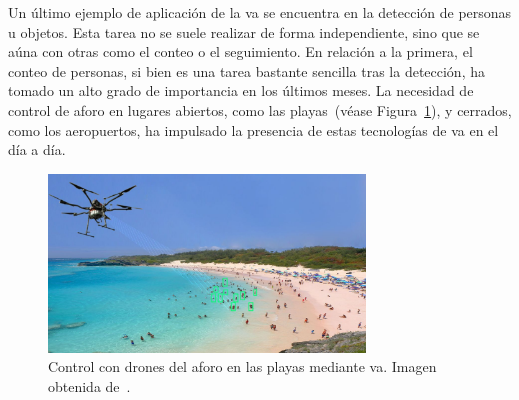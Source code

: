 Un último ejemplo de aplicación de la \acrshort{va} se encuentra en la detección de personas u objetos. Esta tarea no se suele realizar de forma independiente, sino que se aúna con otras como el conteo o el seguimiento. En relación a la primera, el conteo de personas, si bien es una tarea bastante sencilla tras la detección, ha tomado un alto grado de importancia en los últimos meses. La necesidad de control de aforo en lugares abiertos, como las playas~(véase Figura~\ref{fig.aforo}), y cerrados, como los aeropuertos, ha impulsado la presencia de estas tecnologías de \acrshort{va} en el día a día.
\vspace{10pt}
\begin{figure}[H]
		\begin{center}
			\includegraphics[width=0.75\textwidth]{ figures/intro/aforo.jpg}
			\caption{Control con drones del aforo en las playas mediante \acrshort{va}. Imagen obtenida de~\cite{aerocovid}.}
			\label{fig.aforo}
		\end{center}
\end{figure}
\vspace{-10pt}

